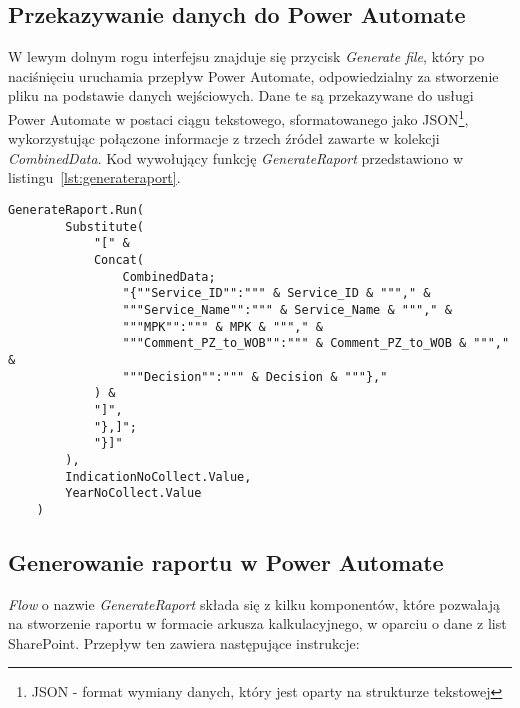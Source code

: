 \subsection{Przekazywanie danych do Power Automate}

W lewym dolnym rogu interfejsu znajduje się przycisk \emph{Generate file}, który po naciśnięciu uruchamia przepływ Power Automate, odpowiedzialny za stworzenie pliku na podstawie danych wejściowych. Dane te są przekazywane do usługi Power Automate w postaci ciągu tekstowego, sformatowanego jako JSON\footnote{JSON - format wymiany danych, który jest oparty na strukturze tekstowej}, wykorzystując połączone informacje z trzech źródeł zawarte w kolekcji \emph{CombinedData}. Kod wywołujący funkcję \emph{GenerateRaport} przedstawiono w listingu~\ref{lst:generateraport}.



\begin{lstlisting}[language=PowerFx, caption={Kod wywołujący funkcję GenerateRaport}, label={lst:generateraport}]
    GenerateRaport.Run(
        Substitute(
            "[" & 
            Concat(
                CombinedData;
                "{""Service_ID"":""" & Service_ID & """," &
                """Service_Name"":""" & Service_Name & """," &
                """MPK"":""" & MPK & """," &
                """Comment_PZ_to_WOB"":""" & Comment_PZ_to_WOB & """," &
                """Decision"":""" & Decision & """},"
            ) & 
            "]",
            "},]"; 
            "}]"
        ),
        IndicationNoCollect.Value,
        YearNoCollect.Value
    )
    \end{lstlisting}



\subsection{Generowanie raportu w Power Automate}


\emph{Flow} o nazwie \emph{GenerateRaport} składa się z kilku komponentów, które 
pozwalają na stworzenie raportu w formacie arkusza kalkulacyjnego, w oparciu o dane z list SharePoint. Przepływ ten zawiera następujące instrukcje:

